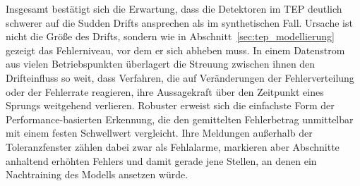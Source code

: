 Insgesamt bestätigt sich die Erwartung, dass die Detektoren im \ac{TEP} deutlich schwerer auf die Sudden Drifts ansprechen als im synthetischen Fall. Ursache ist nicht die Größe des Drifts, sondern wie in Abschnitt~\ref{sec:tep_modellierung} gezeigt das Fehlerniveau, vor dem er sich abheben muss. In einem Datenstrom aus vielen Betriebspunkten überlagert die Streuung zwischen ihnen den Drifteinfluss so weit, dass Verfahren, die auf Veränderungen der Fehlerverteilung oder der Fehlerrate reagieren, ihre Aussagekraft über den Zeitpunkt eines Sprungs weitgehend verlieren. Robuster erweist sich die einfachste Form der Performance-basierten Erkennung, die den gemittelten Fehlerbetrag unmittelbar mit einem festen Schwellwert vergleicht. Ihre Meldungen außerhalb der Toleranzfenster zählen dabei zwar als Fehlalarme, markieren aber Abschnitte anhaltend erhöhten Fehlers und damit gerade jene Stellen, an denen ein Nachtraining des Modells ansetzen würde. \par
%
